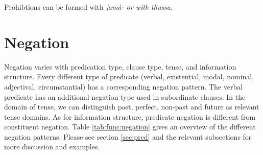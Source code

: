 %
%
%
%
Prohibtions can be formed with \em jamà- \em{} or with \em thussa\em{}.



\section{Negation}\label{sec:func:Negation}
Negation varies with predication type, clause type, tense,  and information structure. Every different type of predicate (verbal, existential, modal, nominal, adjectival, circumstantial) has a corresponding negation pattern. The verbal predicate has an additional negation type used in subordinate clauses. In the domain of tense, we can distinguish past, perfect, non-past and future as relevant tense domains. As for information structure, predicate negation is different from constituent negation. Table \ref{tab:func:negation} gives an overview of the different negation patterns. Please see section \ref{sec:pred} and the relevant subsections for more discussion and examples.

